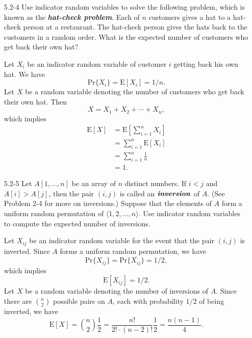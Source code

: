 \begin{enumerate}
\item[5.2{-}4]{Use indicator random variables to solve the following problem,
which is known as the \textbf{\emph{hat-check problem}}. Each of $n$ customers
gives a hat to a hat-check person at a restaurant. The hat-check person
gives the hats back to the customers in a random order. What is the expected
number of customers who get back their own hat?}

\begin{framed}
Let $X_i$ be an indicator random variable of customer $i$ getting back his own
hat. We have
\[
\text{Pr}\{X_i\} = \text{E}[X_i] = 1/n.
\]
Let $X$ be a random variable denoting the number of customers who get back their
own hat. Then
\[
  X = X_1 + X_2 + \cdots + X_n,
\]
which implies
\begin{equation*}
\begin{aligned}
  \text{E}[X] &= \text{E}\left[\sum_{i = 1}^{n} X_i\right]\\
              &= \sum_{i = 1}^{n} \text{E}[X_i]\\
              &= \sum_{i = 1}^{n} \frac{1}{n}\\
              &= 1.
\end{aligned}
\end{equation*}
\end{framed}

\item[5.2{-}5]{Let $A[1, \dots, n]$ be an array of $n$ distinct numbers. If
$i < j$ and $A[i] > A[j]$, then the pair $(i, j)$ is called an
$\textbf{\emph{inversion}}$ of $A$. (See Problem 2-4 for more on inversions.)
Suppose that the elements of $A$ form a uniform random permutation of
$\langle 1, 2, \dots, n \rangle$. Use indicator random variables to compute
the expected number of inversions.}

\begin{framed}
Let $X_{ij}$ be an indicator random variable for the event that the pair
$(i, j)$ is inverted. Since $A$ forms a uniform random permutation, we have
\[
\text{Pr}\{X_{ij}\} = \text{Pr}\{\overline{X_{ij}}\} = 1/2,
\]
which implies
\[
  \text{E}[X_{ij}] = 1/2.
\]
Let $X$ be a random variable denoting the number of
inversions of $A$. Since there are $\binom{n}{2}$ possible pairs on $A$, each
with probability $1/2$ of being inverted, we have
\[
  \text{E}[X] = \binom{n}{2} \frac{1}{2} = \frac{n!}{2! \cdot (n - 2)!} \frac{1}{2} = \frac{n (n - 1)}{4}.
\]
\end{framed}

\end{enumerate}

